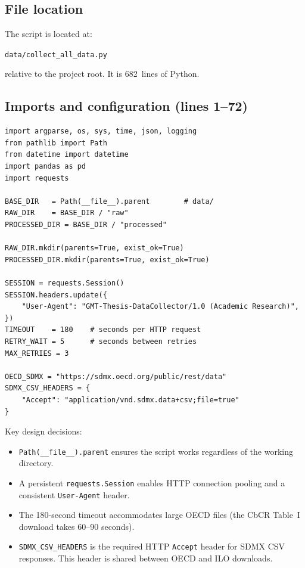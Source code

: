\documentclass[12pt,a4paper]{article}
\begin{document}
\subsection{File location}

The script is located at:
\begin{center}
\texttt{data/collect\_all\_data.py}
\end{center}
relative to the project root.
It is 682~lines of Python.

\subsection{Imports and configuration (lines 1--72)}

\begin{lstlisting}[caption={Configuration block},firstnumber=1]
import argparse, os, sys, time, json, logging
from pathlib import Path
from datetime import datetime
import pandas as pd
import requests

BASE_DIR   = Path(__file__).parent        # data/
RAW_DIR    = BASE_DIR / "raw"
PROCESSED_DIR = BASE_DIR / "processed"

RAW_DIR.mkdir(parents=True, exist_ok=True)
PROCESSED_DIR.mkdir(parents=True, exist_ok=True)

SESSION = requests.Session()
SESSION.headers.update({
    "User-Agent": "GMT-Thesis-DataCollector/1.0 (Academic Research)",
})
TIMEOUT    = 180    # seconds per HTTP request
RETRY_WAIT = 5      # seconds between retries
MAX_RETRIES = 3

OECD_SDMX = "https://sdmx.oecd.org/public/rest/data"
SDMX_CSV_HEADERS = {
    "Accept": "application/vnd.sdmx.data+csv;file=true"
}
\end{lstlisting}

Key design decisions:
\begin{itemize}
    \item \texttt{Path(\_\_file\_\_).parent} ensures the script works regardless of the working directory.
    \item A persistent \texttt{requests.Session} enables HTTP connection pooling and a consistent \texttt{User-Agent} header.
    \item The 180-second timeout accommodates large OECD files (the CbCR Table~I download takes 60--90 seconds).
    \item \texttt{SDMX\_CSV\_HEADERS} is the required HTTP \texttt{Accept} header for SDMX CSV responses.
    This header is shared between OECD and ILO downloads.
\end{itemize}
\end{document}

